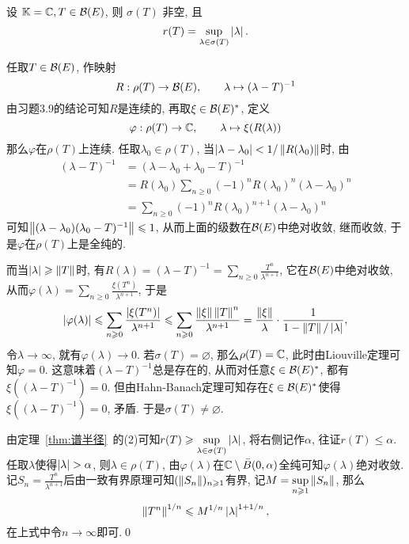 	\begin{Theorem}[谱半径定理]\label{thm:谱半径定理}
		设 $ \mathbb{K}=\mathbb{C}, T\in\mathcal{B}(E) $, 则 $ \sigma(T) $ 非空, 且
		\[
			r(T)=\sup_{\lambda\in\sigma(T)}\left| \lambda \right| .
		\]
	\end{Theorem}
	\begin{Proof}
		任取$ T\in\mathcal{B}(E) $, 作映射
		\[
		R : \rho(T)\to\mathcal{B}(E),\qquad \lambda\mapsto(\lambda-T)^{-1}
		\]
		由习题3.9的结论可知$ R $是连续的, 再取$ \xi\in\mathcal{B}(E)^{*} $, 定义
		\[
		\varphi : \rho(T)\to\mathbb{C},\qquad \lambda\mapsto\xi(R(\lambda))
		\]
		那么$ \varphi $在$ \rho(T) $上连续. 任取$ \lambda_0\in\rho(T) $, 当$ \left| \lambda-\lambda_0 \right| <1/\left\| R(\lambda_0) \right\| $时, 由
		\[
		\begin{aligned}
		(\lambda-T)^{-1}&=(\lambda-\lambda_0+\lambda_0-T)^{-1}\\
		&=R(\lambda_0)\sum_{n\geqslant 0}(-1)^nR(\lambda_0)^n(\lambda-\lambda_0)^n\\
		&=\sum_{n\geqslant 0}(-1)^nR(\lambda_0)^{n+1}(\lambda-\lambda_0)^n
		\end{aligned}
		\]
		可知$ \left\| (\lambda-\lambda_0)(\lambda_0-T)^{-1} \right\|\leqslant 1 $, 从而上面的级数在$ \mathcal{B}(E) $中绝对收敛, 继而收敛, 于是$ \varphi $在$ \rho(T) $上是全纯的.
		
		而当$ \left| \lambda \right| \geqslant\left\| T \right\| $时, 有$ R(\lambda)=(\lambda-T)^{-1}=\sum\limits_{n\geqslant 0}\frac{T^n}{\lambda^{n+1}} $, 它在$ \mathcal{B}(E) $中绝对收敛, 从而$ \varphi(\lambda)=\sum\limits_{n\geqslant 0}\frac{\xi(T^n)}{\lambda^{n+1}} $, 于是
		\[
		\left| \varphi(\lambda) \right| \leqslant\sum_{n\geqslant 0}\frac{\left| \xi(T^n) \right| }{\lambda^{n+1}}\leqslant\sum_{n\geqslant 0}\frac{\left\| \xi \right\|\left\| T \right\|^n}{\lambda^{n+1}}=\frac{\left\| \xi \right\|}{\lambda}\cdot\frac{1}{1-\left\| T \right\|/\left| \lambda \right| },
		\]
		令$ \lambda\to\infty $, 就有$ \varphi(\lambda)\to 0 $. 若$ \sigma(T)=\varnothing $, 那么$ \rho(T)=\mathbb{C} $, 此时由Liouville定理可知$ \varphi=0 $. 这意味着$ (\lambda-T)^{-1} $总是存在的, 从而对任意$ \xi\in\mathcal{B}(E)^{*} $, 都有$ \xi((\lambda-T)^{-1})=0 $. 但由Hahn-Banach定理可知存在$ \xi\in\mathcal{B}(E)^{*} $使得$ \xi((\lambda-T)^{-1})=0 $, 矛盾. 于是$ \sigma(T)\ne\varnothing $.
		
		由定理~\ref{thm:谱半径}~的(2)可知$ r(T)\geqslant\sup\limits_{\lambda\in\sigma(T)}\left| \lambda \right|  $, 将右侧记作$ \alpha $, 往证$ r(T)\leqslant\alpha $. 任取$ \lambda $使得$ \left| \lambda \right| >\alpha $, 则$ \lambda\in\rho(T) $, 由$ \varphi(\lambda) $在$ \mathbb{C}\setminus\bar{B}(0,\alpha) $全纯可知$ \varphi(\lambda) $绝对收敛. 记$ S_n=\frac{T^n}{\lambda^{n+1}} $后由一致有界原理可知$ (\left\| S_n \right\|)_{n\geqslant 1} $有界, 记$ M=\sup\limits_{n\geqslant 1}\left\| S_n \right\| $, 那么
		\[
		\left\| T^n \right\|^{1/n}\leqslant M^{1/n}\left| \lambda \right| ^{1+1/n},
		\]
		在上式中令$ n\to\infty $即可.\qed
	\end{Proof}

